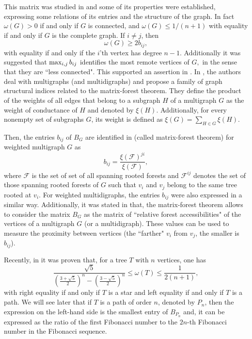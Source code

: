 \documentclass[12pt]{article}
\begin{document}
This matrix was studied in \cite{Merris_II} and some of its properties  were established, expressing some relations of its entries and the structure of the graph. In fact $\omega(G)>0$ if and only if $G$ is connected, and 
$\omega(G) \leq 1/(n + 1)$ with equality if and only if $G$ is the complete graph.  If $i \neq j$, 
then 
\[
\omega(G) \geq  2b_{ij},
\]
with equality if and only if the $i$'th vertex has degree $n - 1.$ 
Additionally it was suggested that $\mbox{\rm{max}}_{i,j}\,  b_{ij}$ identifies the most remote vertices of $G,$ in the sense that they are ``less connected". This supported an assertion in \cite{Chebotarev}. In \cite{Chebotarev}, the authors deal with multigraphs (and multidigraphs) and propose a family of graph structural indices related to the matrix-forest theorem. They define the product of the weights of all edges that belong to a subgraph $H$ of a multigraph $G$ as the weight of conductance of $H$ and denoted by $ \xi (H)$. Additionally, for every nonempty set of subgraphs $G$, its weight is defined as $\xi(G) = \sum_{H \in G} \xi (H).$

Then, the entries $b_{ij}$ of $B_G$  are identified in \cite[Theorem 3]{Chebotarev} (called matrix-forest theorem) for weighted multigraph $G$ as 
\[
b_{ij} =\frac{\xi (\mathcal{F})^{ji}}{\xi(\mathcal{F})},
\]
where $\mathcal{F}$ is the set of  set of all spanning rooted forests and $ \mathcal{F}^{ij}$ denotes the set of those spanning rooted forests of $G$ such that $v_i$ and $v_j$ belong to the same tree rooted at $v_i$. For weighted multidigraphs, the entries $b_{ij}$ were also expressed in a similar way.
Additionally, it was stated in \cite{Chebotarev} that, the matrix-forest theorem allows to consider the matrix $B_G$ as the matrix of ``relative forest
accessibilities" of the vertices of a multigraph $G$ (or a multidigraph). These values can be used to measure the proximity between vertices (the ``farther" $v_i$ from $v_j$, the smaller is $b_{ij}$).

Recently, in \cite{Zhang} it was proven that, for a tree $T$ with $n$ vertices, one has
$$\frac{\sqrt{5}}{(\frac{3+\sqrt{5}}{2})^{n} -(\frac{3-\sqrt{5}}{2})^{n}}\leq \omega(T) \leq \frac{1}{2(n+1)},$$
with right equality if and only if $T$ is a star and left equality if and only if $T$ is a path. 
We will see later that if $T$ is a path of order $n$, denoted by
$P_n$, then the expression on the left-hand side is the smallest entry of 
$B_{P_{n}}$ and, it can be expressed as the ratio of the first Fibonacci number to the 
$2n$-th Fibonacci number in the Fibonacci sequence.
\end{document}
